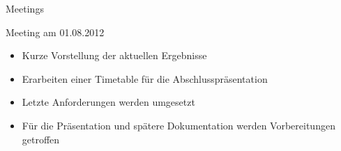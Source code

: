 \begin{frame}{Meetings}
\begin{block}{Meeting am 01.08.2012}
\begin{itemize}[<+->]
\pause\item Kurze Vorstellung der aktuellen Ergebnisse
\item Erarbeiten einer Timetable für die Abschlusspräsentation
\item Letzte Anforderungen werden umgesetzt
\item Für die Präsentation und spätere Dokumentation werden Vorbereitungen getroffen
\end{itemize}
\end{block}
\end{frame}